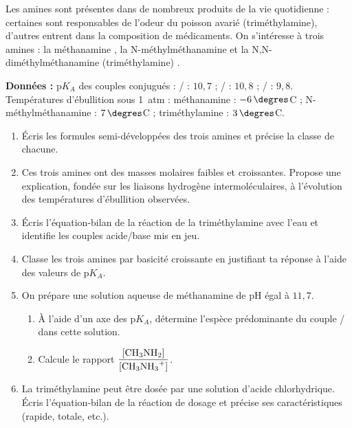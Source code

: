 \documentclass[11pt]{article}
\newcommand{\legende}[1]{\par\vspace{6pt}{\popsemi\fontsize{9}{11.5}\selectfont\color{popmuted}#1}}
\begin{document}
\begin{exercice}
Les amines sont présentes dans de nombreux produits de la vie quotidienne : certaines sont responsables de l'odeur du poisson avarié (triméthylamine), d'autres entrent dans la composition de médicaments. On s'intéresse à trois amines : la méthanamine , la N-méthylméthanamine  et la N,N-diméthylméthanamine (triméthylamine) .

\medskip
\textbf{Données :} p$K_A$ des couples conjugués : / : $10,7$ ; / : $10,8$ ; / : $9,8$. Températures d'ébullition sous \SI{1}{atm} : méthanamine : $-6\,\degres$C ; N-méthylméthanamine : $7\,\degres$C ; triméthylamine : $3\,\degres$C.
\begin{enumerate}
\item Écris les formules semi-développées des trois amines et précise la classe de chacune.
\item Ces trois amines ont des masses molaires faibles et croissantes. Propose une explication, fondée sur les liaisons hydrogène intermoléculaires, à l'évolution des températures d'ébullition observées.
\item Écris l'équation-bilan de la réaction de la triméthylamine avec l'eau et identifie les couples acide/base mis en jeu.
\item Classe les trois amines par basicité croissante en justifiant ta réponse à l'aide des valeurs de p$K_A$.
\item On prépare une solution aqueuse de méthanamine de pH égal à $11,7$. 
\begin{enumerate}
\item À l'aide d'un axe des p$K_A$, détermine l'espèce prédominante du couple / dans cette solution.
\item Calcule le rapport $\dfrac{[\ce{CH3NH2}]}{[\ce{CH3NH3+}]}$.
\end{enumerate}
\item La triméthylamine peut être dosée par une solution d'acide chlorhydrique. Écris l'équation-bilan de la réaction de dosage et précise ses caractéristiques (rapide, totale, etc.).
\end{enumerate}
\end{exercice}

\begin{popfigure}
\legende{Axe des p$K_A$ pour le couple \ce{CH3NH3+}/\ce{CH3NH2} (p$K_A$ = 10,7).}
\end{popfigure}
\end{document}
